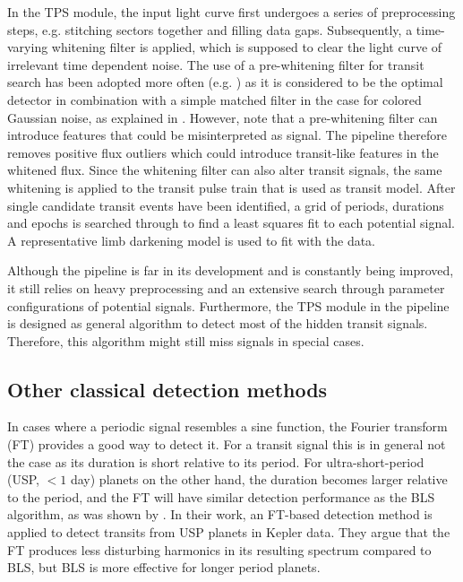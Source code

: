 In the TPS module, the input light curve first undergoes a series of preprocessing steps, e.g. stitching sectors together and filling data gaps. Subsequently, a time-varying whitening filter is applied, which is supposed to clear the light curve of irrelevant time dependent noise. The use of a pre-whitening filter for transit search has been adopted more often (e.g. \cite{carpano2003detecting}) as it is considered to be the optimal detector in combination with a simple matched filter in the case for colored Gaussian noise, as explained in \cite{jenkins2002impact}. However, \cite{rodenbeck2018revisiting} note that a pre-whitening filter can introduce features that could be misinterpreted as signal. The pipeline therefore removes positive flux outliers which could introduce transit-like features in the whitened flux. Since the whitening filter can also alter transit signals, the same whitening is applied to the transit pulse train that is used as transit model. After single candidate transit events have been identified, a grid of periods, durations and epochs is searched through to find a least squares fit to each potential signal. A representative limb darkening model is used to fit with the data.

Although the pipeline is far in its development and is constantly being improved, it still relies on heavy preprocessing and an extensive search through parameter configurations of potential signals. Furthermore, the TPS module in the pipeline is designed as general algorithm to detect most of the hidden transit signals. Therefore, this algorithm might still miss signals in special cases.

\subsection{Other classical detection methods}

In cases where a periodic signal resembles a sine function, the Fourier transform (FT) provides a good way to detect it. For a transit signal this is in general not the case as its duration is short relative to its period. For ultra-short-period (USP, $< 1$ day) planets on the other hand, the duration becomes larger relative to the period, and the FT will have similar detection performance as the BLS algorithm, as was shown by \cite{sanchis2014study}. In their work, an FT-based detection method is applied to detect transits from USP planets in Kepler data. They argue that the FT produces less disturbing harmonics in its resulting spectrum compared to BLS, but BLS is more effective for longer period planets. 

